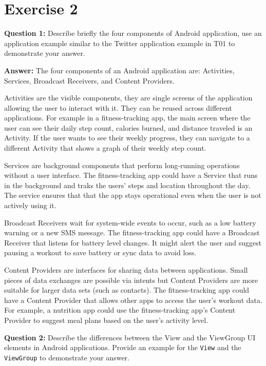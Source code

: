 \documentclass{usireport}
\begin{document}
\section{Exercise 2}

\textbf{Question 1:} Describe briefly the four components of Android application, use an application example similar to the Twitter application example in T01 to demonstrate your answer.

\textbf{Answer:} The four components of an Android application are: Activities, Services, Broadcast Receivers, and Content Providers. 

Activities are the visible components, they are single screens of the application allowing the user to interact with it. They can be reused across different applications. For example in a fitness-tracking app, the main screen where the user can see their daily step count, calories burned, and distance traveled is an Activity. If the user wants to see their weekly progress, they can navigate to a different Activity that shows a graph of their weekly step count.

Services are background components that perform long-running operations without a user interface. The fitness-tracking app could have a Service that runs in the background and traks the users' steps and location throughout the day. The service ensures that that the app stays operational even when the user is not actively using it.

Broadcast Receivers wait for system-wide events to occur, such as a low battery warning or a new SMS message. The fitness-tracking app could have a Broadcast Receiver that listens for battery level changes. It might alert the user and suggest pausing a workout to save battery or sync data to avoid loss.

Content Providers are interfaces for sharing data between applications. Small pieces of data exchanges are possible via intents but Content Providers are more suitable for larger data sets (such as contacts). The fitness-tracking app could have a Content Provider that allows other apps to access the user's workout data. For example, a nutrition app could use the fitness-tracking app's Content Provider to suggest meal plans based on the user's activity level.

\bigbreak

\textbf{Question 2:} Describe the differences between the View and the ViewGroup UI elements in Android applications. Provide an example for the \texttt{View} and the \texttt{ViewGroup} to demonstrate your answer.
\end{document}

